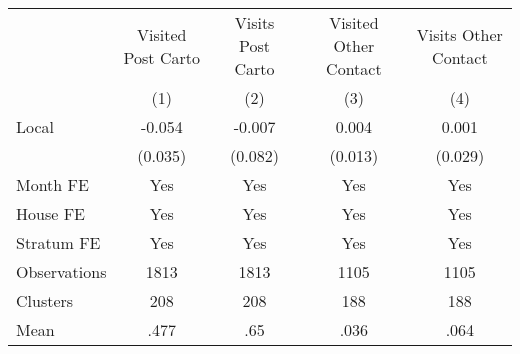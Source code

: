 {
\def\sym#1{\ifmmode^{#1}\else\(^{#1}\)\fi}
\begin{tabular}{l*{4}{c}}
\toprule
                &\multicolumn{1}{c}{Visited Post Carto}&\multicolumn{1}{c}{Visits Post Carto}&\multicolumn{1}{c}{Visited Other Contact}&\multicolumn{1}{c}{Visits Other Contact}\\
                &\multicolumn{1}{c}{(1)}         &\multicolumn{1}{c}{(2)}         &\multicolumn{1}{c}{(3)}         &\multicolumn{1}{c}{(4)}         \\
\midrule
Local           &   -0.054         &   -0.007         &    0.004         &    0.001         \\
                &  (0.035)         &  (0.082)         &  (0.013)         &  (0.029)         \\
Month FE        &      Yes         &      Yes         &      Yes         &      Yes         \\
House FE        &      Yes         &      Yes         &      Yes         &      Yes         \\
Stratum FE      &      Yes         &      Yes         &      Yes         &      Yes         \\
\midrule
Observations    &     1813         &     1813         &     1105         &     1105         \\
Clusters        &      208         &      208         &      188         &      188         \\
Mean            &     .477         &      .65         &     .036         &     .064         \\
\bottomrule
\end{tabular}
}

